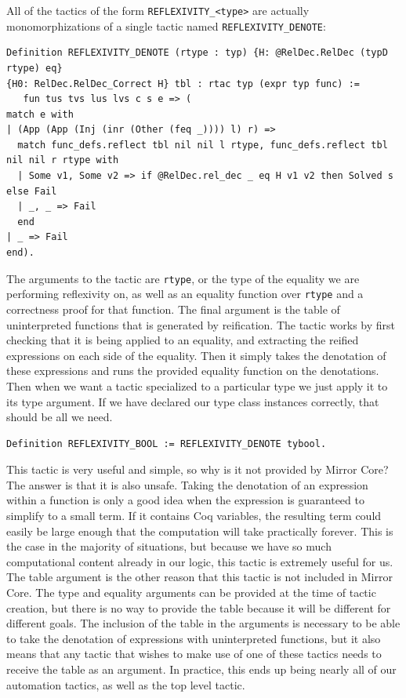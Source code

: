 \documentclass{puthesis}
\begin{document}
All of the tactics of the form \lstinline|REFLEXIVITY_<type>| are
actually monomorphizations of a single tactic named
\lstinline|REFLEXIVITY_DENOTE|:

\begin{lstlisting}
Definition REFLEXIVITY_DENOTE (rtype : typ) {H: @RelDec.RelDec (typD rtype) eq}
{H0: RelDec.RelDec_Correct H} tbl : rtac typ (expr typ func) := 
   fun tus tvs lus lvs c s e => (
match e with
| (App (App (Inj (inr (Other (feq _)))) l) r) =>
  match func_defs.reflect tbl nil nil l rtype, func_defs.reflect tbl nil nil r rtype with
  | Some v1, Some v2 => if @RelDec.rel_dec _ eq H v1 v2 then Solved s else Fail
  | _, _ => Fail
  end
| _ => Fail
end).
\end{lstlisting}

The arguments to the tactic are \lstinline|rtype|, or the type of the equality we are
performing reflexivity on, as well as an equality function over
\lstinline|rtype| and a correctness proof for that function. The final
argument is the table of uninterpreted functions that is generated by reification.
 The
tactic works by first checking that it is being applied to an
equality, and extracting the reified expressions on each side of the
equality. Then it simply takes the denotation of these expressions and
runs the provided equality function on the denotations. Then when we
want a tactic specialized to a particular type we just apply it to its
type argument. If we have declared our type class instances correctly,
that should be all we need.

\begin{lstlisting}
Definition REFLEXIVITY_BOOL := REFLEXIVITY_DENOTE tybool.
\end{lstlisting}

This tactic is very useful and simple, so why is it not provided by
Mirror Core? The answer is that it is also unsafe. Taking the
denotation of an expression within a function is only a good idea when
the expression is guaranteed to simplify to a small term. If it
contains Coq variables, the resulting term could easily be large
enough that the computation will take practically forever. This is the
case in the majority of situations, but because we have so much
computational content already in our logic, this tactic is extremely
useful for us. The table argument is the other reason that this tactic
is not included in Mirror Core. The type and equality arguments can be
provided at the time of tactic creation, but there is no way to
provide the table because it will be different for different
goals. The inclusion of the table in the arguments is necessary to be
able to take the denotation of expressions with uninterpreted
functions, but it also means that any tactic that wishes to make use
of one of these tactics needs to receive the table as an argument. In
practice, this ends up being nearly all of our automation tactics, as
well as the top level tactic.
\end{document}

